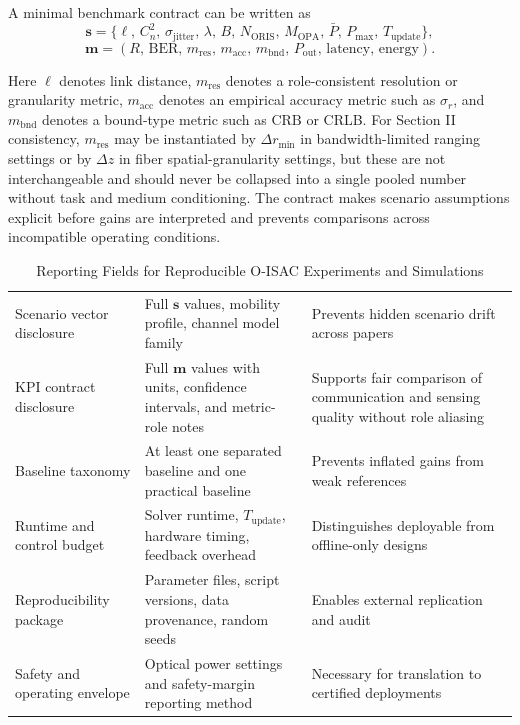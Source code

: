 A minimal benchmark contract can be written as
\[
\mathbf{s}=\{\ell,\,C_n^2,\,\sigma_{\text{jitter}},\,\lambda,\,B,\,N_{\text{ORIS}},\,M_{\text{OPA}},\,\bar P,\,P_{\max},\,T_{\text{update}}\},
\]
\[
\mathbf{m}=(R,\,\mathrm{BER},\,m_{\text{res}},\,m_{\text{acc}},\,m_{\text{bnd}},\,P_{\text{out}},\,\text{latency},\,\text{energy}).
\]

Here $\ell$ denotes link distance, $m_{\text{res}}$ denotes a role-consistent resolution or granularity metric, $m_{\text{acc}}$ denotes an empirical accuracy metric such as $\sigma_r$, and $m_{\text{bnd}}$ denotes a bound-type metric such as $\mathrm{CRB}$ or CRLB. For Section II consistency, $m_{\text{res}}$ may be instantiated by $\Delta r_{\min}$ in bandwidth-limited ranging settings or by $\Delta z$ in fiber spatial-granularity settings, but these are not interchangeable and should never be collapsed into a single pooled number without task and medium conditioning. The contract makes scenario assumptions explicit before gains are interpreted and prevents comparisons across incompatible operating conditions.

\begin{table}[htbp]
\caption{Reporting Fields for Reproducible O-ISAC Experiments and Simulations}
\label{tab:vi_d_reporting}
\centering
\setlength{\tabcolsep}{4pt}
\renewcommand{\arraystretch}{1.12}
\begin{tabularx}{\textwidth}{@{}L{2.8cm}Y Y@{}}
\toprule
{} &  &  \\
\midrule
Scenario vector disclosure & Full $\mathbf{s}$ values, mobility profile, channel model family & Prevents hidden scenario drift across papers \\
KPI contract disclosure & Full $\mathbf{m}$ values with units, confidence intervals, and metric-role notes & Supports fair comparison of communication and sensing quality without role aliasing \\
Baseline taxonomy & At least one separated baseline and one practical baseline & Prevents inflated gains from weak references \\
Runtime and control budget & Solver runtime, $T_{\text{update}}$, hardware timing, feedback overhead & Distinguishes deployable from offline-only designs \\
Reproducibility package & Parameter files, script versions, data provenance, random seeds & Enables external replication and audit \\
Safety and operating envelope & Optical power settings and safety-margin reporting method & Necessary for translation to certified deployments \\
\bottomrule
\end{tabularx}
\end{table}

